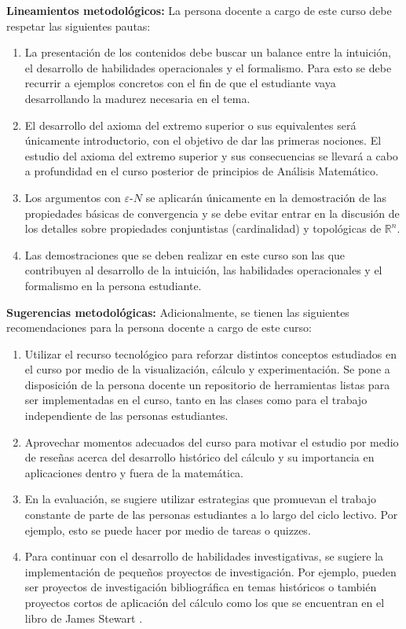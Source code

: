 \begin{refsection}
\noindent \textbf{Lineamientos metodológicos:} La persona docente a cargo de este curso debe respetar las siguientes pautas:
\begin{enumerate}
    \item La presentación de los contenidos debe buscar un balance entre la intuición, el desarrollo de habilidades operacionales y el formalismo. Para esto se debe recurrir a ejemplos concretos con el fin de que el estudiante vaya desarrollando la madurez necesaria en el tema. 
    \item El desarrollo del axioma del extremo superior o sus equivalentes será únicamente introductorio, con el objetivo de dar las primeras nociones. El estudio del axioma del extremo superior y sus consecuencias se llevará a cabo a profundidad en el curso posterior de principios de Análisis Matemático. 
    \item Los argumentos con $\varepsilon$-$N$ se aplicarán únicamente en la demostración de las propiedades básicas de convergencia y se debe evitar entrar en la discusión de los detalles sobre propiedades conjuntistas (cardinalidad) y topológicas de $\mathbb{R}^n$.
    \item Las demostraciones que se deben realizar en este curso son las que contribuyen al desarrollo de la intuición, las habilidades operacionales y el formalismo en la persona estudiante.
\end{enumerate}

\textbf{Sugerencias metodológicas:} Adicionalmente, se tienen las siguientes recomendaciones para la persona docente a cargo de este curso:
\begin{enumerate}
    \item Utilizar el recurso tecnológico para reforzar distintos conceptos estudiados en el curso por medio de la visualización, cálculo y experimentación. Se pone a disposición de la persona docente un repositorio de herramientas listas para ser implementadas en el curso, tanto en las clases como para el trabajo independiente de las personas estudiantes.
    \item Aprovechar momentos adecuados del curso para motivar el estudio por medio de reseñas acerca del desarrollo histórico del cálculo y su importancia en aplicaciones dentro y fuera de la matemática.
    \item En la evaluación, se sugiere utilizar estrategias que promuevan el trabajo constante de parte de las personas estudiantes a lo largo del ciclo lectivo. Por ejemplo, esto se puede hacer por medio de tareas o quizzes.
    \item Para continuar con el desarrollo de habilidades investigativas, se sugiere la implementación de pequeños proyectos de investigación. Por ejemplo, pueden ser proyectos de investigación bibliográfica en temas históricos o también proyectos cortos de aplicación del cálculo como los que se encuentran en el libro de James Stewart \cite{Ste18}.
\end{enumerate}


\end{refsection}
